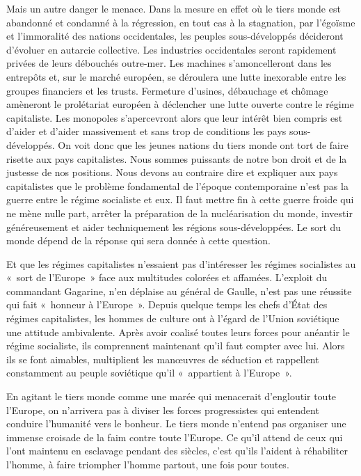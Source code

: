 \documentclass[french,twoside]{book} %
\begin{document}
Mais un autre danger le menace. Dans la mesure en effet où le tiers monde est abandonné et condamné à la régression, en   tout cas à la stagnation, par l’égoïsme et l’immoralité des nations occidentales, les peuples sous-développés décideront d’évoluer en autarcie collective. Les industries occidentales seront rapidement privées de leurs débouchés outre-mer. Les machines s’amoncelleront dans les entrepôts et, sur le marché européen, se déroulera une lutte inexorable entre les groupes financiers et les trusts. Fermeture d’usines, débauchage et chômage amèneront le prolétariat européen à déclencher une lutte ouverte contre le régime capitaliste. Les monopoles s’apercevront alors que leur intérêt bien compris est d’aider et d’aider massivement et sans trop de conditions les pays sous-développés. On voit donc que les jeunes nations du tiers monde ont tort de faire risette aux pays capitalistes. Nous sommes puissants de notre bon droit et de la justesse de nos positions. Nous devons au contraire dire et expliquer aux pays capitalistes que le problème fondamental de l’époque contemporaine n’est pas la guerre entre le régime socialiste et eux. Il faut mettre fin à cette guerre froide qui ne mène nulle part, arrêter la préparation de la nucléarisation du monde, investir généreusement et aider techniquement les régions sous-développées. Le sort du monde dépend de la réponse qui sera donnée à cette question.\par
\bigbreak
\noindent Et que les régimes capitalistes n’essaient pas d’intéresser les régimes socialistes au « sort de l’Europe » face aux multitudes colorées et affamées. L’exploit du commandant Gagarine, n’en déplaise au général de Gaulle, n’est pas une réussite qui fait « honneur à l’Europe ». Depuis quelque temps les chefs d’État des régimes capitalistes, les hommes de culture ont à l’égard de l’Union soviétique une attitude ambivalente. Après avoir coalisé toutes leurs forces pour anéantir le régime socialiste, ils comprennent maintenant qu’il faut compter avec lui. Alors ils se font aimables, multiplient les manœuvres de séduction et rappellent constamment au peuple soviétique qu’il « appartient à l’Europe ».\par
En agitant le tiers monde comme une marée qui menacerait d’engloutir toute l’Europe, on n’arrivera pas à diviser les forces   progressistes qui entendent conduire l’humanité vers le bonheur. Le tiers monde n’entend pas organiser une immense croisade de la faim contre toute l’Europe. Ce qu’il attend de ceux qui l’ont maintenu en esclavage pendant des siècles, c’est qu’ils l’aident à réhabiliter l’homme, à faire triompher l’homme partout, une fois pour toutes.\par
\end{document}
